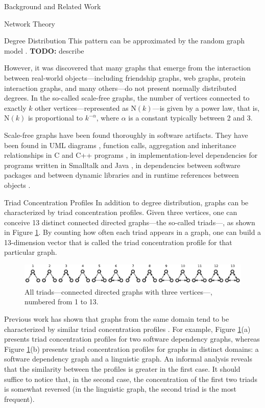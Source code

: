 \documentclass[11pt,twocolumn,a4paper,english]{article}
\newcommand{\TODO}{\textbf{TODO:} }
\begin{document}
\begin{section}{Background and Related Work}
\begin{subsection}{Network Theory}
\begin{subsubsection}{Degree Distribution}
	This pattern can be approximated by the random graph model \cite{Erdos1959}. \TODO describe
	
	However, it was discovered that many graphs that emerge from the interaction between real-world objects---including friendship graphs, web graphs, protein interaction graphs, and many others---do not present normally distributed degrees. In the so-called scale-free graphs, the number of vertices connected to exactly $k$ other vertices---represented as $\mathrm{N}(k)$---is given by a power law, that is, $\mathrm{N}(k)$ is proportional to $k^{-\alpha}$, where $\alpha$ is a constant typically between 2 and 3.
	
	Scale-free graphs have been found thoroughly in software artifacts. They have been found in UML diagrams \cite{Valverde2003}, function calls, aggregation and inheritance relationships in C and C++ programs \cite{Myers2003}, in implementation-level dependencies for programs written in Smalltalk and Java \cite{Marchesi2004,Concas2007,Hyland-Wood2006,Baxter2006,Ichii2008}, in dependencies between software packages \cite{Labelle2004} and between dynamic libraries \cite{Louridas2008} and in runtime references between objects \cite{Potanin2005}.	
\end{subsubsection}
	
\begin{subsubsection}{Triad Concentration Profiles}
	In addition to degree distribution, graphs can be characterized by triad concentration profiles. Given three vertices, one can conceive 13 distinct connected directed graphs---the so-called triads---, as shown in Figure \ref{fig:triads}. By counting how often each triad appears in a graph, one can build a 13-dimension vector that is called the triad concentration profile for that particular graph. %

	\begin{figure}[htbp]
		\centering
			\includegraphics[scale=1]{figures/triads}
		\caption{All triads---connected directed graphs with three vertices---, numbered from 1 to 13.}
		\label{fig:triads}
	\end{figure}

	Previous work has shown that graphs from the same domain tend to be characterized by similar triad concentration profiles \cite{Milo2002}. For example, Figure \ref{fig:triads}(a) presents triad concentration profiles for two software dependency graphs, whereas Figure \ref{fig:triads}(b) presents triad concentration profiles for graphs in distinct domains: a software dependency graph and a linguistic graph. An informal analysis reveals that the similarity between the profiles is greater in the first case. It should suffice to notice that, in the second case, the concentration of the first two triads is somewhat reversed (in the linguistic graph, the second triad is the most frequent).


\end{subsubsection}
\end{subsection}
\end{section}
\end{document}
